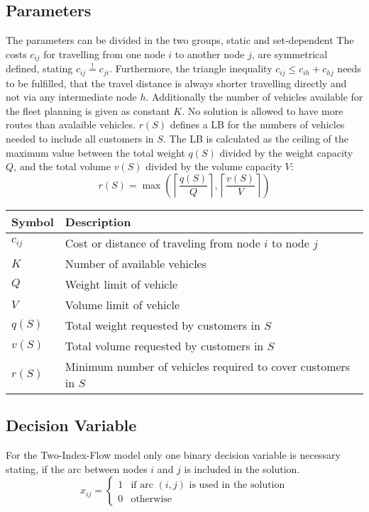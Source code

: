 \subsection*{Parameters}
The parameters can be divided in the two groups, static and set-dependent
The costs $c_{ij}$ for travelling from one node $i$ to another node $j$,
are symmetrical defined, stating $c_{ij} \overset{!}{=} c_{ji}$. Furthermore, the triangle inequality
$c_{ij} \leq c_{ih} + c_{hj}$ needs to be fulfilled, that the travel distance is always shorter travelling
directly and not via any intermediate node $h$. Additionally the number of vehicles
available for the fleet planning is given as constant $K$. No solution is allowed to have
more routes than avalaible vehicles. $r(S)$ defines a \gls{LB} for the numbers of vehicles needed
to include all customers in $S$. The \gls{LB} is calculated as the ceiling of the maximum
value between the total weight $q(S)$ divided by the weight capacity $Q$, and the
total volume $v(S)$ divided by the volume capacity $V$:
\[r(S) = \max\left( \left\lceil \frac{q(S)}{Q} \right\rceil, \left\lceil \frac{v(S)}{V} \right\rceil \right)\]

\begin{table}[ht]
    \centering
    \begin{tabular}{ll}
        \toprule
        Symbol   & Description                                                   \\
        \midrule
        $c_{ij}$ & Cost or distance of traveling from node $i$ to node $j$       \\
        $K$      & Number of available vehicles                                  \\
        $Q$      & Weight limit of vehicle                                       \\
        $V$      & Volume limit of vehicle                                       \\
        $q(S)$   & Total weight requested by customers in $S$                    \\
        $v(S)$   & Total volume requested by customers in $S$                    \\
        $r(S)$   & Minimum number of vehicles required to cover customers in $S$ \\
        \bottomrule
    \end{tabular}
\end{table}

\bigskip

\subsection*{Decision Variable}
For the Two-Index-Flow model only one binary decision variable is necessary stating, if the arc
between nodes $i$ and $j$ is included in the solution.
\[
    x_{ij} =
    \begin{cases}
        1 & \text{if arc } (i,j) \text{ is used in the solution} \\
        0 & \text{otherwise}
    \end{cases}
\]

